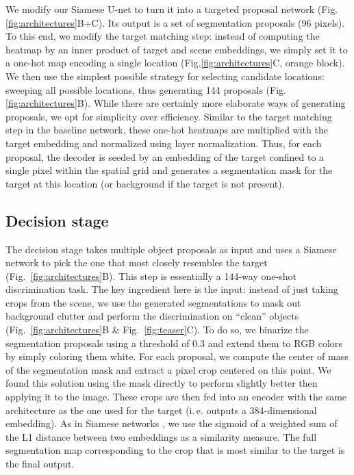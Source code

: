 \documentclass{article}
\begin{document}
We modify our Siamese U-net to turn it into a targeted proposal network (Fig.\ref{fig:architectures}B+C).
Its output is a set of segmentation proposals (96 pixels).
To this end, we modify the target matching step: instead of computing the heatmap by an inner product of target and scene embeddings, we simply set it to a one-hot map encoding a single location (Fig.\ref{fig:architectures}C, orange block).
We then use the simplest possible strategy for selecting candidate locations: sweeping all possible locations, thus generating 144 proposals (Fig.\ref{fig:architectures}B).
While there are certainly more elaborate ways of generating proposals, we opt for simplicity over efficiency.
Similar to the target matching step in the baseline network, these one-hot heatmaps are multiplied with the target embedding and normalized using layer normalization.
Thus, for each proposal, the decoder is seeded by an embedding of the target confined to a single pixel within the  spatial grid and generates a segmentation mask for the target at this location (or background if the target is not present).


\subsection{Decision stage}
\label{sec:refined/decision}

The decision stage takes multiple object proposals as input and uses a Siamese network to pick the one that most closely resembles the target (Fig.~\ref{fig:architectures}B).
This step is essentially a 144-way one-shot discrimination task.
The key ingredient here is the input: instead of just taking crops from the scene, we use the generated segmentations to mask out background clutter and perform the discrimination on ``clean'' objects (Fig.~\ref{fig:architectures}B \& Fig.~\ref{fig:teaser}C).
To do so, we binarize the segmentation proposals using a threshold of 0.3 and extend them to RGB colors by simply coloring them white.
For each proposal, we compute the center of mass of the segmentation mask and extract a  pixel crop centered on this point. We found this solution using the mask directly to perform slightly better then applying it to the image.
These crops are then fed into an encoder with the same architecture as the one used for the target (i.\,e. outputs a 384-dimensional embedding).
As in Siamese networks \cite{Koch2015a}, we use the sigmoid of a weighted sum of the L1 distance between two embeddings as a similarity measure. 
The full segmentation map corresponding to the crop that is most similar to the target is the final output.
\end{document}
